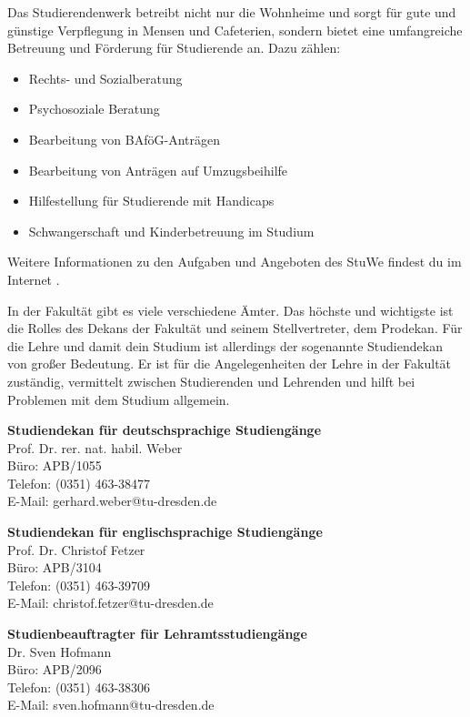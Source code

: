 Das Studierendenwerk betreibt nicht nur die Wohnheime und sorgt für gute und günstige Verpflegung in Mensen und Cafeterien, sondern bietet eine umfangreiche Betreuung und Förderung für Studierende an. Dazu zählen:

\begin{itemize}
\item Rechts- und Sozialberatung
\item Psychosoziale Beratung
\item Bearbeitung von BAföG-Anträgen
\item Bearbeitung von Anträgen auf Umzugsbeihilfe
\item Hilfestellung für Studierende mit Handicaps
\item Schwangerschaft und Kinderbetreuung im Studium
\end{itemize}

Weitere Informationen zu den Aufgaben und Angeboten des StuWe findest du im Internet .

In der Fakultät gibt es viele verschiedene Ämter. 
Das höchste und wichtigste ist die Rolles des Dekans der Fakultät und seinem Stellvertreter, dem Prodekan. 
Für die Lehre und damit dein Studium ist allerdings der sogenannte Studiendekan von großer Bedeutung.
Er ist für die Angelegenheiten der Lehre in der Fakultät zuständig, vermittelt zwischen Studierenden und Lehrenden und hilft bei Problemen mit dem Studium allgemein.

\textbf{Studiendekan für deutschsprachige Studiengänge}\\
Prof. Dr. rer. nat. habil. Weber \\
Büro: APB/1055 \\
Telefon: (0351) 463-38477 \\
E-Mail: gerhard.weber@tu-dresden.de

\textbf{Studiendekan für englischsprachige Studiengänge}\\
Prof. Dr. Christof Fetzer \\
Büro: APB/3104 \\
Telefon: (0351) 463-39709 \\
E-Mail: christof.fetzer@​tu-dresden.de

\textbf{Studienbeauftragter für Lehramtsstudiengänge}\\
Dr. Sven Hofmann \\
Büro: APB/2096 \\
Telefon: (0351) 463-38306 \\
E-Mail: sven.hofmann@​tu-dresden.de

